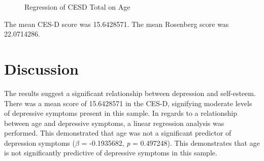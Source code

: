 \documentclass[
  man,
  floatsintext,
  longtable,
  nolmodern,
  notxfonts,
  notimes,
  colorlinks=true,linkcolor=blue,citecolor=blue,urlcolor=blue]{apa7}
\begin{document}
\begin{figure}

\caption{\label{fig-CESD-total-versus-age}Regression of CESD Total on
Age}


\end{figure}%

The mean CES-D score was 15.6428571. The mean Rosenberg score was
22.0714286.

\section{Discussion}\label{discussion}

The results suggest a significant relationship between depression and
self-esteem. There was a mean score of 15.6428571 in the CES-D,
signifying moderate levels of depressive symptoms present in this
sample. In regards to a relationship between age and depressive
symptoms, a linear regression analysis was performed. This demonstrated
that age was not a significant predictor of depression symptoms
(\(\beta\) = -0.1935682, \emph{p} = 0.497248). This demonstrates that
age is not significantly predictive of depressive symptoms in this
sample.
\end{document}
